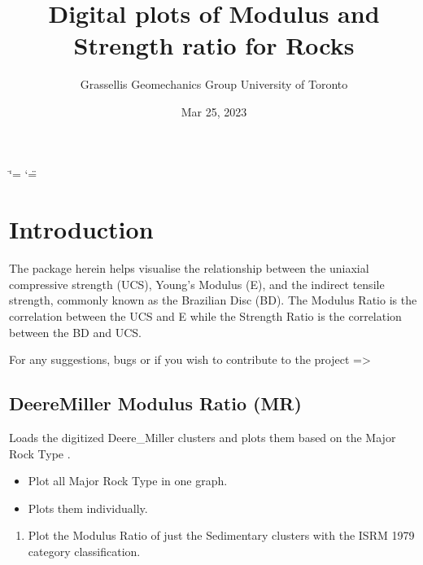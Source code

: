 \documentclass[letterpaper,10pt,english]{sphinxmanual}
\title{Digital plots of Modulus and Strength ratio for Rocks}
\date{Mar 25, 2023}
\author{Grasselli\textquotesingle{}s Geomechanics Group \sphinxhyphen{} University of Toronto}
\begin{document}
\ifdefined\shorthandoff
  \ifnum\catcode`\=\string=\active\shorthandoff{=}\fi
  \ifnum\catcode`\"=\active{}\fi
\fi

\pagestyle{empty}
\sphinxmaketitle
\pagestyle{plain}
\sphinxtableofcontents
\pagestyle{normal}
\label{\detokenize{index::doc}}


\sphinxstepscope


\chapter{Introduction}
\label{\detokenize{postprocessing_intro:introduction}}\label{\detokenize{postprocessing_intro::doc}}
\sphinxAtStartPar
The package herein helps visualise the relationship between the uniaxial compressive strength (UCS), Young’s Modulus (E), and the in\sphinxhyphen{}direct tensile strength, commonly known as the Brazilian Disc (BD). The Modulus Ratio  is the correlation between the UCS and E while the Strength Ratio  is the correlation between the BD and UCS.

\sphinxAtStartPar
For any suggestions, bugs or if you wish to contribute to the project =\textgreater{} 


\section{Deere\sphinxhyphen{}Miller \sphinxhyphen{} Modulus Ratio (MR)}
\label{\detokenize{postprocessing_intro:deere-miller-modulus-ratio-mr}}
\sphinxAtStartPar
{}

\sphinxAtStartPar
Loads the digitized Deere\_Miller clusters and plots them based on the Major Rock Type .
\begin{itemize}
\item {} 
\sphinxAtStartPar
Plot all Major Rock Type in one graph.

\item {} 
\sphinxAtStartPar
Plots them individually.

\end{itemize}

\sphinxAtStartPar
{}
\begin{enumerate}
%
\item {} 
\sphinxAtStartPar
Plot the Modulus Ratio of just the Sedimentary clusters with the ISRM 1979 category classification.

\end{enumerate}
\end{document}
